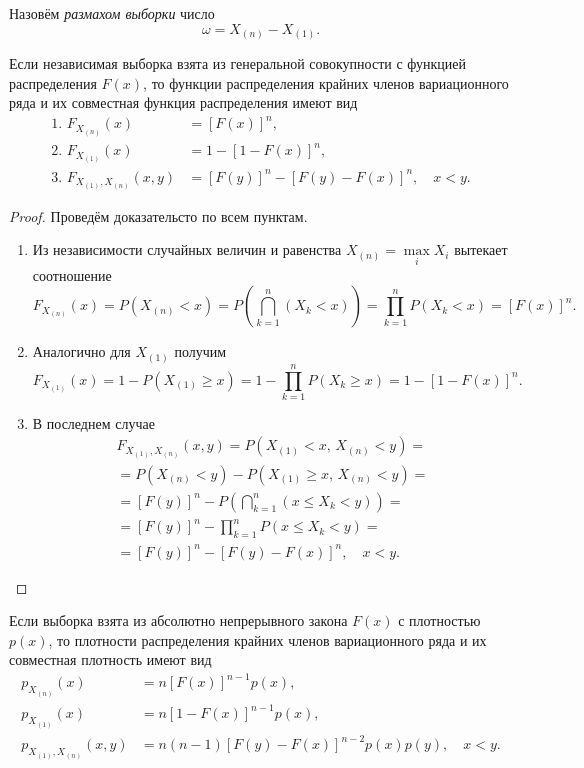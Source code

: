 \begin{definition}
Назовём \emph{размахом выборки} число
\[
	\omega = X_{(n)} - X_{(1)}.
\]
\end{definition}

\begin{theorem}
	Если независимая выборка взята из генеральной совокупности с
функцией распределения $F(x)$, то функции распределения крайних членов
вариационного ряда и их совместная функция распределения имеют вид 
\begin{align*}
	\text{1. }F_{X_{(n)}}(x) &= [F(x)]^n,\\
	\text{2. }F_{X_{(1)}}(x) &= 1 - [1 - F(x)]^n,\\
	\text{3. }F_{X_{(1)}, X_{(n)}} (x, y) &= [F(y)]^n - [F(y)-F(x)]^n, \quad x < y.
\end{align*}
\end{theorem}
\begin{proof} Проведём доказательсто по всем пунктам.
	\begin{enumerate}
		\item Из независимости случайных величин и равенства $ X_{(n)} = \max\limits_i X_i $ вытекает соотношение
	\[
		F_{X_{(n)}}(x) = P \left( X_{(n)} < x \right) = P \left( \bigcap_{k=1}^n (X_k <
		x)\right) = \prod_{k=1}^n P(X_k < x) = [F(x)]^n.
	\]
\item Аналогично для $ X_{(1)} $ получим 
\[
	F_{X_{(1)}}(x) = 1 - P(X_{(1)} \geqslant x) = 1 - \prod_{k=1}^n P(X_k \geqslant
	x) = 1 - [1- F(x)]^n.
\]
\item В последнем случае 
\begin{multline*}
	F_{X_{(1)}, X_{(n)}}(x,y) = P(X_{(1)} < x, \, X_{(n)} < y) = \\ = P(X_{(n)} < y ) -
	P\left(X_{(1)} \geqslant x, \, X_{(n)} < y \right) = \\ =
	[F(y)]^n - P \left( \bigcap_{k=1}^n (x \leqslant X_k < y ) \right)  = \\ =
	[F(y)]^n - \prod_{k=1}^n P(x \leqslant X_k < y) = \\ =
	[F(y)]^n - [F(y) - F(x)]^n, \quad x < y.
\end{multline*}
\end{enumerate}
\end{proof}
\begin{corollary*}
	Если выборка взята из абсолютно непрерывного закона $F(x)$ с 
плотностью $p(x)$, то плотности распределения крайних членов вариационного ряда и их 
совместная плотность имеют вид 
\begin{align*}
	p_{X_{(n)}}(x) &= n[F(x)]^{n-1}p(x),\\
	p_{X_{(1)}}(x) &= n[1-F(x)]^{n-1}p(x),\\
	p_{X_{(1)}, X_{(n)}}(x, y) &= n(n-1)[F(y)-F(x)]^{n-2}p(x)p(y), \quad x < y.
\end{align*} %
\end{corollary*}

